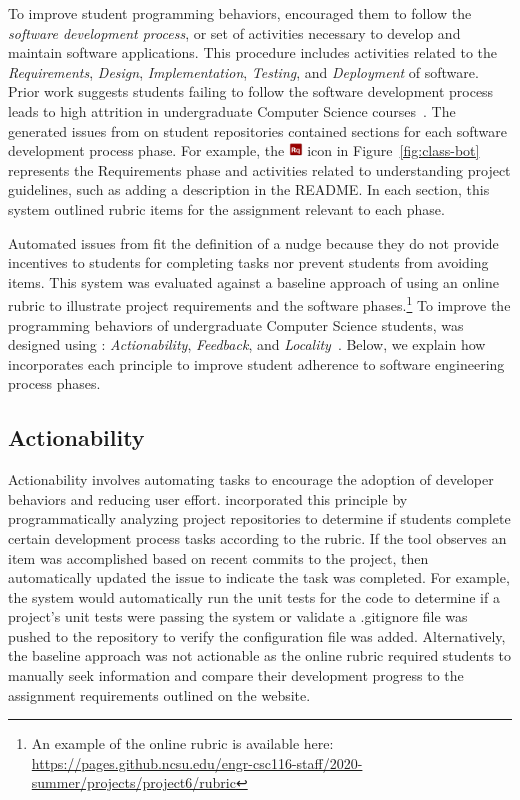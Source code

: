 To improve student programming behaviors, \tooltwo encouraged them to follow the \textit{software development process}, or set of activities necessary to develop and maintain software applications. This procedure includes activities related to the \textit{Requirements}, \textit{Design}, \textit{Implementation}, \textit{Testing}, and \textit{Deployment} of software. Prior work suggests students failing to follow the software development process leads to high attrition in undergraduate Computer Science courses~\cite{beaubouef2005high}. The generated issues from \tooltwo on student repositories contained sections for each software development process phase. For example, the \includegraphics[height=1em]{Chapter-6/images/rq.png} icon in Figure~\ref{fig:class-bot} represents the Requirements phase and activities related to understanding project guidelines, such as adding a description in the README. In each section, this system outlined rubric items for the assignment relevant to each phase. 

Automated issues from \tooltwo fit the definition of a nudge because they do not provide incentives to students for completing tasks nor prevent students from avoiding items. This system was evaluated against a baseline approach of using an online rubric to illustrate project requirements and the software phases.\footnote{An example of the online rubric is available here: \url{https://pages.github.ncsu.edu/engr-csc116-staff/2020-summer/projects/project6/rubric}} To improve the programming behaviors of undergraduate Computer Science students, \tooltwo was designed using \framework: \textit{Actionability}, \textit{Feedback}, and \textit{Locality}~\cite{Sorry2}. Below, we explain how \tooltwo incorporates each principle to improve student adherence to software engineering process phases.

\subsection*{Actionability}

Actionability involves automating tasks to encourage the adoption of developer behaviors and reducing user effort. \tooltwo incorporated this principle by programmatically analyzing project repositories to determine if students complete certain development process tasks according to the rubric. If the tool observes an item was accomplished based on recent commits to the project, then \tooltwo automatically updated the issue to indicate the task was completed. For example, the system would automatically run the unit tests for the code to determine if a project's unit tests were passing the system or validate a .gitignore file was pushed to the repository to verify the configuration file was added. Alternatively, the baseline approach was not actionable as the online rubric required students to manually seek information and compare their development progress to the assignment requirements outlined on the website.

